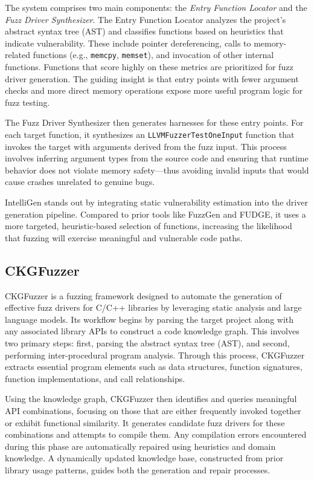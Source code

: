 \documentclass[
  a4paper,
]{scrreprt}
\theoremstyle{definition}
\theoremstyle{remark}
\begin{document}
The system comprises two main components: the \emph{Entry Function
Locator} and the \emph{Fuzz Driver Synthesizer}. The Entry Function
Locator analyzes the project's abstract syntax tree (AST) and classifies
functions based on heuristics that indicate vulnerability. These include
pointer dereferencing, calls to memory-related functions (e.g.,
\texttt{memcpy}, \texttt{memset}), and invocation of other internal
functions. Functions that score highly on these metrics are prioritized
for fuzz driver generation. The guiding insight is that entry points
with fewer argument checks and more direct memory operations expose more
useful program logic for fuzz testing.

The Fuzz Driver Synthesizer then generates harnesses for these entry
points. For each target function, it synthesizes an
\texttt{LLVMFuzzerTestOneInput} function that invokes the target with
arguments derived from the fuzz input. This process involves inferring
argument types from the source code and ensuring that runtime behavior
does not violate memory safety---thus avoiding invalid inputs that would
cause crashes unrelated to genuine bugs.

IntelliGen stands out by integrating static vulnerability estimation
into the driver generation pipeline. Compared to prior tools like
FuzzGen and FUDGE, it uses a more targeted, heuristic-based selection of
functions, increasing the likelihood that fuzzing will exercise
meaningful and vulnerable code paths.

\subsection{CKGFuzzer}\label{ckgfuzzer}

CKGFuzzer \autocite{xu2024} is a fuzzing framework designed to automate
the generation of effective fuzz drivers for C/C++ libraries by
leveraging static analysis and large language models. Its workflow
begins by parsing the target project along with any associated library
APIs to construct a code knowledge graph. This involves two primary
steps: first, parsing the abstract syntax tree (AST), and second,
performing inter-procedural program analysis. Through this process,
CKGFuzzer extracts essential program elements such as data structures,
function signatures, function implementations, and call relationships.

Using the knowledge graph, CKGFuzzer then identifies and queries
meaningful API combinations, focusing on those that are either
frequently invoked together or exhibit functional similarity. It
generates candidate fuzz drivers for these combinations and attempts to
compile them. Any compilation errors encountered during this phase are
automatically repaired using heuristics and domain knowledge. A
dynamically updated knowledge base, constructed from prior library usage
patterns, guides both the generation and repair processes.
\end{document}
